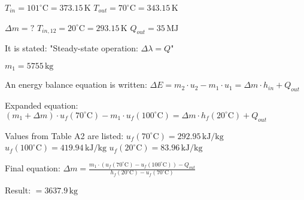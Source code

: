 \( T_{in} = 101^\circ \text{C} = 373.15 \, \text{K} \)  
\( T_{out} = 70^\circ \text{C} = 343.15 \, \text{K} \)  

\( \Delta m = ? \)  
\( T_{in,12} = 20^\circ \text{C} = 293.15 \, \text{K} \)  
\( Q_{out} = 35 \, \text{MJ} \)  

It is stated:  
"Steady-state operation: \( \Delta \lambda = Q \)"  

\( m_1 = 5755 \, \text{kg} \)  

An energy balance equation is written:  
\( \Delta E = m_2 \cdot u_2 - m_1 \cdot u_1 = \Delta m \cdot h_{in} + Q_{out} \)  

Expanded equation:  
\( (m_1 + \Delta m) \cdot u_f(70^\circ \text{C}) - m_1 \cdot u_f(100^\circ \text{C}) = \Delta m \cdot h_f(20^\circ \text{C}) + Q_{out} \)  

Values from Table A2 are listed:  
\( u_f(70^\circ \text{C}) = 292.95 \, \text{kJ/kg} \)  
\( u_f(100^\circ \text{C}) = 419.94 \, \text{kJ/kg} \)  
\( u_f(20^\circ \text{C}) = 83.96 \, \text{kJ/kg} \)  

Final equation:  
\( \Delta m = \frac{m_1 \cdot (u_f(70^\circ \text{C}) - u_f(100^\circ \text{C})) - Q_{out}}{h_f(20^\circ \text{C}) - u_f(70^\circ \text{C})} \)  

Result:  
\( = 3637.9 \, \text{kg} \)
